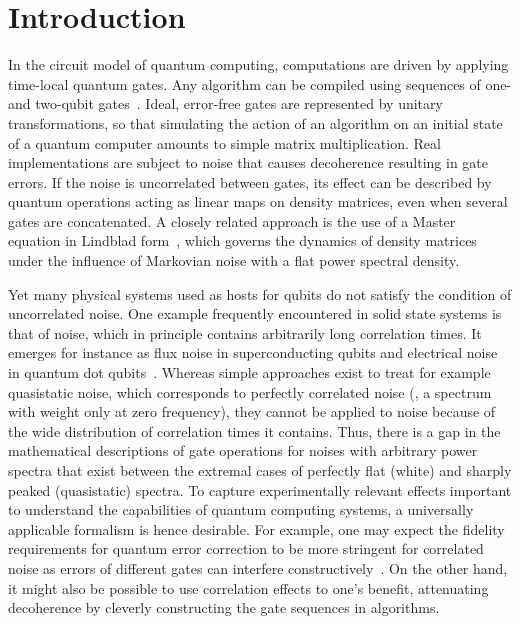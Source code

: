 \chapter{Introduction}\label{ch:ff:introduction}
In the circuit model of quantum computing, computations are driven by applying time-local quantum gates.
Any algorithm can be compiled using sequences of one- and two-qubit gates~\cite{DiVincenzo1995}.
Ideal, error-free gates are represented by unitary transformations, so that simulating the action of an algorithm on an initial state of a quantum computer amounts to simple matrix multiplication.
Real implementations are subject to noise that causes decoherence resulting in gate errors.
If the noise is uncorrelated between gates, its effect can be described by quantum operations acting as linear maps on density matrices, even when several gates are concatenated.
A closely related approach is the use of a Master equation in Lindblad form~\cite{Lindblad1976}, which governs the dynamics of density matrices under the influence of Markovian noise with a flat power spectral density.

Yet many physical systems used as hosts for qubits do not satisfy the condition of uncorrelated noise.
One example frequently encountered in solid state systems is that of \oneoverf noise, which in principle contains arbitrarily long correlation times.
It emerges for instance as flux noise in superconducting qubits and electrical noise in quantum dot qubits~\cite{Brownnutt2015,Kumar2016a,Yoneda2018,Paladino2014}.
Whereas simple approaches exist to treat for example quasistatic noise, which corresponds to perfectly correlated noise (\ie, a spectrum with weight only at zero frequency), they cannot be applied to \oneoverf noise because of the wide distribution of correlation times it contains.
Thus, there is a gap in the mathematical descriptions of gate operations for noises with arbitrary power spectra that exist between the extremal cases of perfectly flat (white) and sharply peaked (quasistatic) spectra.
To capture experimentally relevant effects important to understand the capabilities of quantum computing systems, a universally applicable formalism is hence desirable.
For example, one may expect the fidelity requirements for quantum error correction to be more stringent for correlated noise as errors of different gates can interfere constructively~\cite{Ng2009}.
On the other hand, it might also be possible to use correlation effects to one's benefit, attenuating decoherence by cleverly constructing the gate sequences in algorithms.

